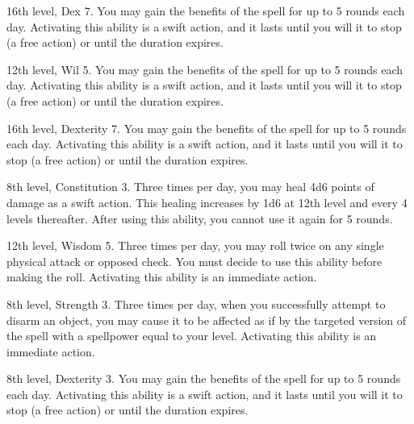 \featpres 16th level, Dex 7.
\featben You may gain the benefits of the 
spell for up to 5 rounds each day.
Activating this ability is a swift action, and it lasts until you will it to stop (a free action) or until the duration expires.

\featpres 12th level, Wil 5.
\featben You may gain the benefits of the 
spell for up to 5 rounds each day.
Activating this ability is a swift action, and it lasts until you will it to stop (a free action) or until the duration expires.

\featpres 16th level, Dexterity 7.
\featben You may gain the benefits of the 
spell for up to 5 rounds each day.
Activating this ability is a swift action, and it lasts until you will it to stop (a free action) or until the duration expires.

\featpres 8th level, Constitution 3.
\featben Three times per day, you may heal 4d6 points of damage as a swift action.
This healing increases by 1d6 at 12th level and every 4 levels thereafter.
After using this ability, you cannot use it again for 5 rounds.

\featpres 12th level, Wisdom 5.
\featben Three times per day, you may roll twice on any single physical attack or opposed check.
You must decide to use this ability before making the roll.
Activating this ability is an immediate action.

\featpres 8th level, Strength 3.
\featben Three times per day, when you successfully attempt to disarm an object, you may cause it to be affected as if by the targeted version of the  spell with a spellpower equal to your level.
Activating this ability is an immediate action.

\featpres 8th level, Dexterity 3.
\featben You may gain the benefits of the 
spell for up to 5 rounds each day.
Activating this ability is a swift action, and it lasts until you will it to stop (a free action) or until the duration expires.

